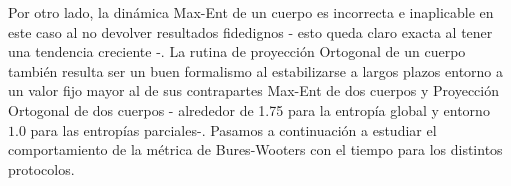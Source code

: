 \documentclass{report} %
\numberwithin{equation}{section}
\begin{document}
Por otro lado, la dinámica Max-Ent de un cuerpo es incorrecta e inaplicable en este caso al no devolver resultados fidedignos - esto queda claro exacta al tener una tendencia creciente -. La rutina de proyección Ortogonal de un cuerpo también resulta ser un buen formalismo al estabilizarse a largos plazos entorno a un valor fijo mayor al de sus contrapartes Max-Ent de dos cuerpos y Proyección Ortogonal de dos cuerpos - alrededor de 1.75 para la entropía global y entorno $1.0$ para las entropías parciales-. Pasamos a continuación a estudiar el comportamiento de la métrica de Bures-Wooters con el tiempo para los distintos protocolos. 

\begin{figure}
\begin{minipage}{.5\linewidth}
\centering
{}
\end{minipage}%
\begin{minipage}{.5\linewidth}
\centering
{}
\end{minipage}\par\medskip

\end{figure}
\end{document}
